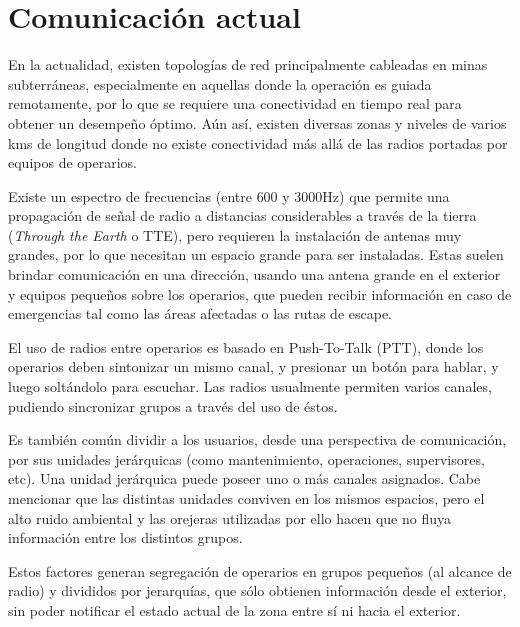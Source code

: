 \section{Comunicación actual}
En la actualidad, existen topologías de red principalmente cableadas en minas subterráneas, especialmente en aquellas donde la operación es guiada remotamente, por lo que se requiere una conectividad en tiempo real para obtener un desempeño óptimo. Aún así, existen diversas zonas y niveles de varios kms de longitud donde no existe conectividad más allá de las radios portadas por equipos de operarios.

Existe un espectro de frecuencias (entre 600 y 3000Hz) que permite una propagación de señal de radio a distancias considerables a través de la tierra (\emph{Through the Earth} o TTE), pero requieren la instalación de antenas muy grandes, por lo que necesitan un espacio grande para ser instaladas. Estas suelen brindar comunicación en una dirección, usando una antena grande en el exterior y equipos pequeños sobre los operarios, que pueden recibir información en caso de emergencias tal como las áreas afectadas o las rutas de escape.

El uso de radios entre operarios es basado en Push-To-Talk (PTT), donde los operarios deben sintonizar un mismo canal, y presionar un botón para hablar, y luego soltándolo para escuchar. Las radios usualmente permiten varios canales, pudiendo sincronizar grupos a través del uso de éstos. 

Es también común dividir a los usuarios, desde una perspectiva de comunicación, por sus unidades jerárquicas (como mantenimiento, operaciones, supervisores, etc). Una unidad jerárquica puede poseer uno o más canales asignados. Cabe mencionar que las distintas unidades conviven en los mismos espacios, pero el alto ruido ambiental y las orejeras utilizadas por ello hacen que no fluya información entre los distintos grupos.

Estos factores generan segregación de operarios en grupos pequeños (al alcance de radio) y divididos por jerarquías, que sólo obtienen información desde el exterior, sin poder notificar el estado actual de la zona entre sí ni hacia el exterior.